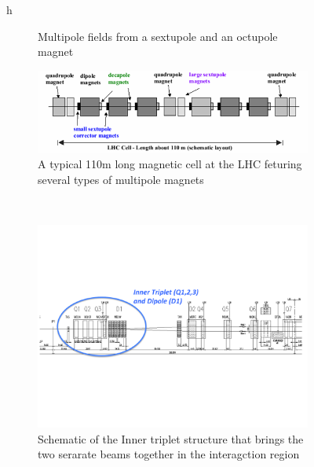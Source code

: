 \begin{figure}{h}
\begin{subfigure}[h]{0.450\textwidth}
        \caption{Multipole fields from a sextupole and an octupole magnet}\label{fig:lhc_multipole_field}
      \end{subfigure}
      \begin{subfigure}[h]{0.450\textwidth}
        \includegraphics[width=\textwidth]{Figures/LHC_Diagrams/LHC_MagneticCell.png}
        \caption{A typical 110m long magnetic cell at the LHC feturing
        several types of multipole magnets}\label{fig:lhc_magnetic_cell}
      \end{subfigure}
      ~ %
      \begin{subfigure}[h]{0.450\textwidth}
        \includegraphics[width=\textwidth]{Figures/LHC_Diagrams/LHC_InnerTriplet.pdf}
        \caption{Schematic of the Inner triplet structure that brings
          the two serarate beams together in the interagction region}\label{fig:lhc_inner_triplet}
      \end{subfigure}
      ~ %
      \begin{subfigure}[h]{0.450\textwidth}

\end{subfigure}
\end{figure}
